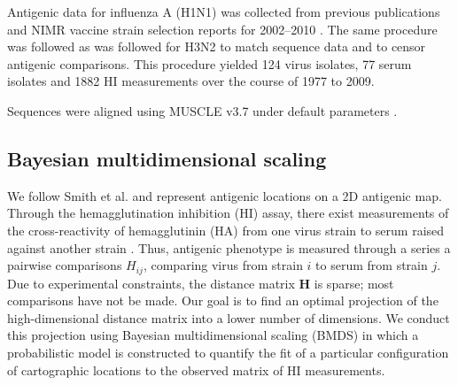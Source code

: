 \documentclass[11pt,oneside,letterpaper]{article}
\begin{document}
Antigenic data for influenza A (H1N1) was collected from previous publications \cite{Kendal78,Webster79,Nakajima79,Nakajima81,Chakraverty82,Pereira82,Chakraverty86,Cox83,Daniels85,Raymond86,Stevens87,Donatelli93,Hay01,Daum02,McDonald07,Barr10} and NIMR vaccine strain selection reports for 2002--2010 \cite{NIMR02,NIMR03,NIMR04,NIMRFeb05,NIMRSep05,NIMRMarch06,NIMRSep06,NIMRMarch07,NIMRSep07,NIMRMarch08,NIMRSep08,NIMRFeb09,NIMRFeb10}.
The same procedure was followed as was followed for H3N2 to match sequence data and to censor antigenic comparisons.
This procedure yielded 124 virus isolates, 77 serum isolates and 1882 HI measurements over the course of 1977 to 2009.

Sequences were aligned using MUSCLE v3.7 under default parameters \cite{MUSCLE}.

\subsection*{Bayesian multidimensional scaling}

We follow Smith et al. \cite{Smith04} and represent antigenic locations on a 2D antigenic map. 
Through the hemagglutination inhibition (HI) assay, there exist measurements of the cross-reactivity of hemagglutinin (HA) from one virus strain to serum raised against another strain \cite{Hirst43}. 
Thus, antigenic phenotype is measured through a series a pairwise comparisons $H_{ij}$, comparing virus from strain $i$ to serum from strain $j$. 
Due to experimental constraints, the distance matrix $\mathbf{H}$ is sparse; most comparisons have not be made. 
Our goal is to find an optimal projection of the high-dimensional distance matrix into a lower number of dimensions. 
We conduct this projection using Bayesian multidimensional scaling (BMDS) \cite{Oh01} in which a probabilistic model is constructed to quantify the fit of a particular configuration of cartographic locations to the observed matrix of HI measurements.
\end{document}
